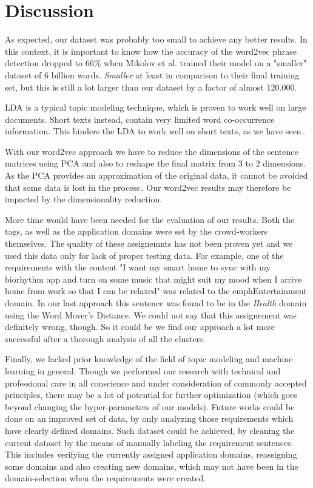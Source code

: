 \section{Discussion}
\label{sec:discussion}
As expected, our dataset was probably too small to achieve any better results. In this context, it is important to know how the accuracy of the word2vec phrase detection dropped to 66\% when Mikolov et al. trained their model on a "smaller" dataset of 6 billion words\cite[p7]{mikolov_distributed_2013}. \emph{Smaller} at least in comparison to their final training set, but this is still a lot larger than our dataset by a factor of almost 120.000.

LDA is a typical topic modeling technique, which is proven to work well on large documents. Short texts instead, contain very limited word co-occurrence information. This hinders the LDA to work well on short texts, as we have seen\,\cite{quan_short_2015}.

With our word2vec approach we have to reduce the dimensions of the sentence matrices using PCA and also to reshape the final matrix from 3 to 2 dimensions. As the PCA provides an approximation of the original data, it cannot be avoided that some data is lost in the process\,\cite{wold_principal_1987}. Our word2vec results may therefore be impacted by the dimensionality reduction.

More time would have been needed for the evaluation of our results. Both the tags, as well as the application domains were set by the crowd-workers themselves. The quality of these assignemnts has not been proven yet and we used this data only for lack of proper testing data. For example, one of the requirements with the content "I want my smart home to sync with my biorhythm app and turn on some music that might suit my mood when I arrive home from work so that I can be relaxed" was related to the emph{Entertainment} domain. In our last approach this sentence was found to be in the \emph{Health} domain using the Word Mover's Distance. We could not say that this assignement was definitely wrong, though. So it could be we find our approach a lot more successful after a thorough analysis of all the clusters.

Finally, we lacked prior knowledge of the field of topic modeling and machine learning in general. Though we performed our research with technical and professional care in all conscience and under consideration of commonly accepted principles, there may be a lot of potential for further optimization (which goes beyond changing the hyper-parameters of our models). Future works could be done on an improved set of data, by only analyzing those requirements which have clearly defined domains. Such dataset could be achieved, by cleaning the current \crowdre{} dataset by the means of manually labeling the requirement sentences. This includes verifying the currently assigned application domains, reassigning some domains and also creating new domains, which may not have been in the domain-selection when the requirements were created.\\

